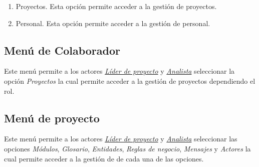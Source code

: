  	\begin{enumerate}
 		\item Proyectos. Esta opción permite acceder a la gestión de proyectos.
 		\item Personal. Esta opción permite acceder a la gestión de personal.
 	\end{enumerate}
 
 
 \subsection{Menú de Colaborador} Este menú permite a los actores {\em {\hyperlink{lider}{Líder de proyecto}}} y {\em {\hyperlink{analista}{Analista}}} seleccionar la opción {\em Proyectos} la cual permite acceder a la gestión de proyectos dependiendo el rol.
 
  
  \subsection{Menú de proyecto} Este menú permite a los actores {\em {\hyperlink{lider}{Líder de proyecto}}} y {\em {\hyperlink{analista}{Analista}}} seleccionar las opciones {\em Módulos}, {\em Glosario}, {\em Entidades}, {\em Reglas de negocio}, {\em Mensajes} y {\em Actores} la cual permite acceder a la gestión de de cada una de las opciones.
 

